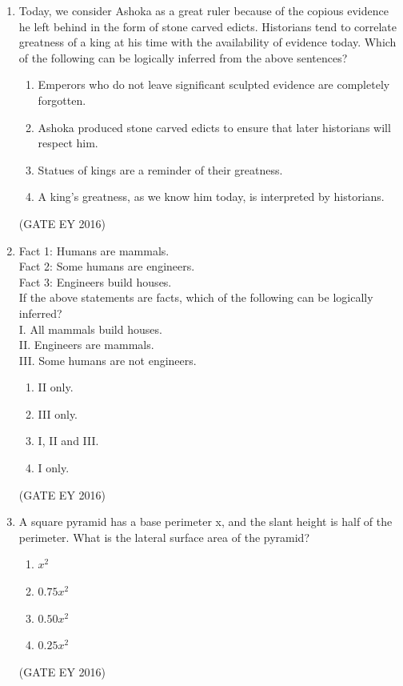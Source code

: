 \documentclass[journal]{IEEEtran}
\begin{document}
\begin{enumerate}[label=Q.\arabic*.]
\item Today, we consider Ashoka as a great ruler because of the copious evidence he left behind in the form of stone carved edicts. Historians tend to correlate greatness of a king at his time with the availability of evidence today. Which of the following can be logically inferred from the above sentences?
\begin{enumerate}
    \item Emperors who do not leave significant sculpted evidence are completely forgotten.
    \item Ashoka produced stone carved edicts to ensure that later historians will respect him.
    \item Statues of kings are a reminder of their greatness.
    \item A king's greatness, as we know him today, is interpreted by historians.
    \end{enumerate}
\hfill{(GATE EY 2016)}

\item Fact 1: Humans are mammals. \\
Fact 2: Some humans are engineers. \\
Fact 3: Engineers build houses.
\\
If the above statements are facts, which of the following can be logically inferred? \\
I. All mammals build houses. \\
II. Engineers are mammals. \\
III. Some humans are not engineers.
\begin{multicols}{2}
\begin{enumerate}
    \item II only.
    \item III only.
    \item I, II and III.
    \item I only.
    \end{enumerate}
\end{multicols}
\hfill{(GATE EY 2016)}

\item A square pyramid has a base perimeter x, and the slant height is half of the perimeter. What is the lateral surface area of the pyramid?
\begin{multicols}{4}
\begin{enumerate}
    \item $x^{2}$
    \item $0.75 x^{2}$
    \item $0.50 x^{2}$
    \item $0.25 x^{2}$
\end{enumerate}
\end{multicols}
\hfill{(GATE EY 2016)}


\end{enumerate}
\end{document}

